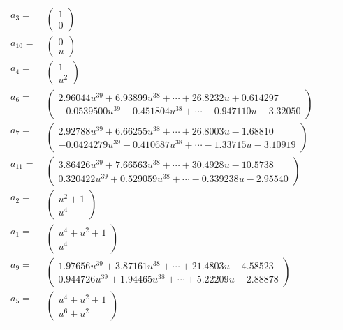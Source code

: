 \documentclass[1p]{elsarticle_modified}
\theoremstyle{definition}
\begin{document}
\begin{tabular}{m{7pt} m{180pt} m{7pt} m{180pt} }
\flushright $a_{3}=$&$\begin{pmatrix}1\\0\end{pmatrix}$ \\
\flushright $a_{10}=$&$\begin{pmatrix}0\\u\end{pmatrix}$ \\
\flushright $a_{4}=$&$\begin{pmatrix}1\\u^2\end{pmatrix}$ \\
\flushright $a_{6}=$&$\begin{pmatrix}2.96044 u^{39}+6.93899 u^{38}+\cdots+26.8232 u+0.614297\\-0.0539500 u^{39}-0.451804 u^{38}+\cdots-0.947110 u-3.32050\end{pmatrix}$ \\
\flushright $a_{7}=$&$\begin{pmatrix}2.92788 u^{39}+6.66255 u^{38}+\cdots+26.8003 u-1.68810\\-0.0424279 u^{39}-0.410687 u^{38}+\cdots-1.33715 u-3.10919\end{pmatrix}$ \\
\flushright $a_{11}=$&$\begin{pmatrix}3.86426 u^{39}+7.66563 u^{38}+\cdots+30.4928 u-10.5738\\0.320422 u^{39}+0.529059 u^{38}+\cdots-0.339238 u-2.95540\end{pmatrix}$ \\
\flushright $a_{2}=$&$\begin{pmatrix}u^2+1\\u^4\end{pmatrix}$ \\
\flushright $a_{1}=$&$\begin{pmatrix}u^4+u^2+1\\u^4\end{pmatrix}$ \\
\flushright $a_{9}=$&$\begin{pmatrix}1.97656 u^{39}+3.87161 u^{38}+\cdots+21.4803 u-4.58523\\0.944726 u^{39}+1.94465 u^{38}+\cdots+5.22209 u-2.88878\end{pmatrix}$ \\
\flushright $a_{5}=$&$\begin{pmatrix}u^4+u^2+1\\u^6+u^2\end{pmatrix}$ \\

\end{tabular}
\end{document}

